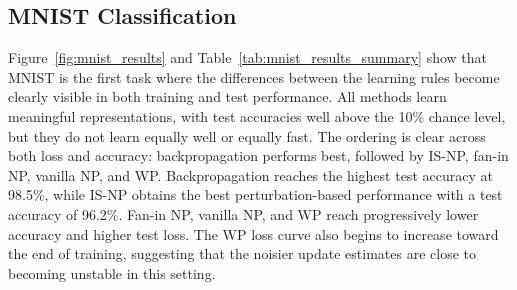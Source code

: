 \FloatBarrier

\subsection{MNIST Classification}

Figure~\ref{fig:mnist_results} and Table~\ref{tab:mnist_results_summary} show that MNIST is the first task where the differences between the learning rules become clearly visible in both training and test performance. All methods learn meaningful representations, with test accuracies well above the 10\% chance level, but they do not learn equally well or equally fast. The ordering is clear across both loss and accuracy: backpropagation performs best, followed by IS-NP, fan-in NP, vanilla NP, and WP. Backpropagation reaches the highest test accuracy at 98.5\%, while IS-NP obtains the best perturbation-based performance with a test accuracy of 96.2\%. Fan-in NP, vanilla NP, and WP reach progressively lower accuracy and higher test loss. The WP loss curve also begins to increase toward the end of training, suggesting that the noisier update estimates are close to becoming unstable in this setting.


